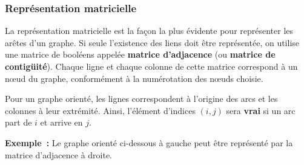 		\subsubsection{Représentation matricielle}

			La représentation matricielle est la façon la plus évidente 
			pour représenter les arêtes d'un graphe. Si seule
			l'existence des liens doit être représentée, on utilise une 
			matrice de booléens appelée \textbf{matrice d'adjacence}
			(ou \textbf{matrice de contigüité}). Chaque ligne et chaque 
			colonne de cette matrice correspond à un n{\oe}ud du
			graphe, conformément à la numérotation des n{\oe}uds choisie.

			Pour un graphe orienté, les lignes correspondent à l'origine des 
			arcs et les colonnes à leur extrémité. Ainsi, l'élément
			d'indices $(i, j)$ sera \textbf{vrai} si un arc 
			part de $i$ et arrive en $j$.

			\textbf{Exemple~:} Le graphe orienté ci-dessous à gauche 
			peut être représenté par la matrice d'adjacence à droite.

